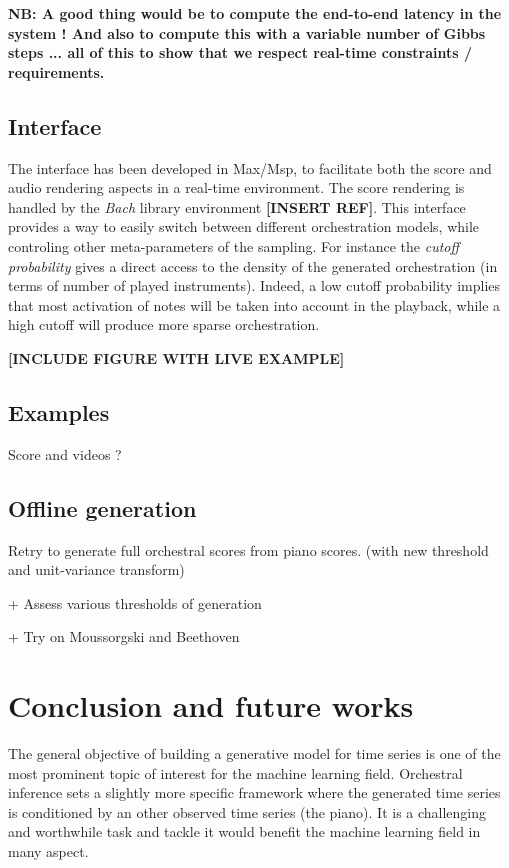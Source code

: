 \documentclass[letterpaper]{article}
\begin{document}
\textbf{NB: A good thing would be to compute the end-to-end latency
in the system ! And also to compute this with a variable number of
Gibbs steps ... all of this to show that we respect real-time constraints
/ requirements.}

\subsection{Interface}
The interface has been developed in Max/Msp, to facilitate both the
score and audio rendering aspects in a real-time environment. The
score rendering is handled by the \emph{Bach }library environment
\textbf{{[}INSERT REF{]}}. This interface provides a way to easily
switch between different orchestration models, while controling other
meta-parameters of the sampling. For instance the \emph{cutoff probability
}gives a direct access to the density of the generated orchestration
(in terms of number of played instruments). Indeed, a low cutoff probability
implies that most activation of notes will be taken into account in
the playback, while a high cutoff will produce more sparse orchestration.

\textbf{{[}INCLUDE FIGURE WITH LIVE EXAMPLE{]}}

\subsection{Examples}

Score and videos ?


\subsection{Offline generation}

Retry to generate full orchestral scores from piano scores. (with
new threshold and unit-variance transform) 

+ Assess various thresholds of generation

+ Try on Moussorgski and Beethoven



\section{Conclusion and future works}
The general objective of building a generative model for time series is one of the most prominent topic of interest for the machine learning field. Orchestral inference sets a slightly more specific framework where the generated time series is conditioned by an other observed time series (the piano). It is a challenging and worthwhile task and tackle it would benefit the machine learning field in many aspect.
\end{document}
